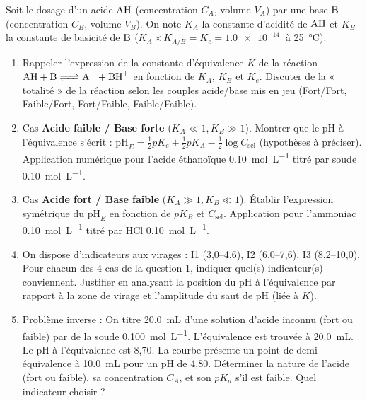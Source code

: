 \documentclass[11pt]{article}
\begin{document}
\begin{exercice}
Soit le dosage d'un acide $\ce{AH}$ (concentration $C_A$, volume $V_A$) par une base $\ce{B}$ (concentration $C_B$, volume $V_B$). On note $K_A$ la constante d'acidité de $\ce{AH}$ et $K_B$ la constante de basicité de $\ce{B}$ ($K_A \times K_{A/B} = K_e = \SI{1,0e-14}{}$ à \SI{25}{\celsius}).
\begin{enumerate}
    \item Rappeler l'expression de la constante d'équivalence $K$ de la réaction $\ce{AH + B <=> A- + BH+}$ en fonction de $K_A$, $K_B$ et $K_e$. Discuter de la « totalité » de la réaction selon les couples acide/base mis en jeu (Fort/Fort, Faible/Fort, Fort/Faible, Faible/Faible).
    \item Cas \textbf{Acide faible / Base forte} ($K_A \ll 1, K_B \gg 1$). Montrer que le pH à l'équivalence s'écrit : $\text{pH}_E = \frac{1}{2}pK_e + \frac{1}{2}pK_A - \frac{1}{2}\log C_{\text{sel}}$ (hypothèses à préciser). Application numérique pour l'acide éthanoïque \SI{0,10}{mol.L^{-1}} titré par soude \SI{0,10}{mol.L^{-1}}.
    \item Cas \textbf{Acide fort / Base faible} ($K_A \gg 1, K_B \ll 1$). Établir l'expression symétrique du $\text{pH}_E$ en fonction de $pK_B$ et $C_{\text{sel}}$. Application pour l'ammoniac \SI{0,10}{mol.L^{-1}} titré par HCl \SI{0,10}{mol.L^{-1}}.
    \item On dispose d'indicateurs aux virages : I1 (3,0--4,6), I2 (6,0--7,6), I3 (8,2--10,0). Pour chacun des 4 cas de la question 1, indiquer quel(s) indicateur(s) conviennent. Justifier en analysant la position du pH à l'équivalence par rapport à la zone de virage et l'amplitude du saut de pH (liée à $K$).
    \item Problème inverse : On titre \SI{20,0}{mL} d'une solution d'acide inconnu (fort ou faible) par de la soude \SI{0,100}{mol.L^{-1}}. L'équivalence est trouvée à \SI{20,0}{mL}. Le pH à l'équivalence est 8,70. La courbe présente un point de demi-équivalence à \SI{10,0}{mL} pour un pH de 4,80.
    Déterminer la nature de l'acide (fort ou faible), sa concentration $C_A$, et son $pK_a$ s'il est faible. Quel indicateur choisir ?
\end{enumerate}
\end{exercice}
\end{document}
